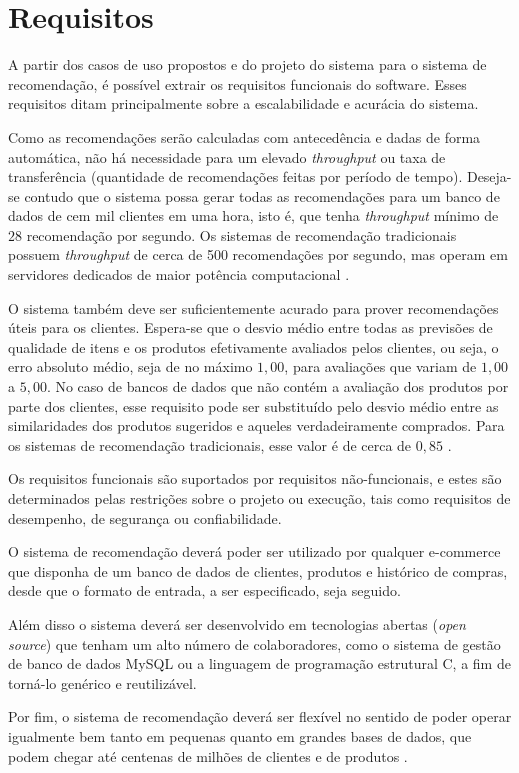 \chapter[Requisitos]{Requisitos}
\label{chap:requisitos}

A partir dos casos de uso propostos e do projeto do sistema para o sistema de recomendação, é possível extrair os requisitos funcionais do software. Esses requisitos ditam principalmente sobre a escalabilidade e acurácia do sistema.

Como as recomendações serão calculadas com antecedência e dadas de forma automática, não há necessidade para um elevado \textit{throughput} ou taxa de transferência (quantidade de recomendações feitas por período de tempo). Deseja-se contudo que o sistema possa gerar todas as recomendações para um banco de dados de cem mil clientes em uma hora, isto é, que tenha \textit{throughput} mínimo de $28$ recomendação por segundo. Os sistemas de recomendação tradicionais possuem \textit{throughput} de cerca de 500 recomendações por segundo, mas operam em servidores dedicados de maior potência computacional \cite{sarwar2001item}.  

O sistema também deve ser suficientemente acurado para prover recomendações úteis para os clientes. Espera-se que o desvio médio entre todas as previsões de qualidade de itens e os produtos efetivamente avaliados pelos clientes, ou seja, o erro absoluto médio, seja de no máximo $1,00$, para avaliações que variam de $1,00$ a $5,00$. No caso de bancos de dados que não contém a avaliação dos produtos por parte dos clientes, esse requisito pode ser substituído pelo desvio médio entre as similaridades dos produtos sugeridos e aqueles verdadeiramente comprados. Para os sistemas de recomendação tradicionais, esse valor é de cerca de $0,85$ \cite{sarwar2002recommender}.

Os requisitos funcionais são suportados por requisitos não-funcionais, e estes são determinados pelas restrições sobre o projeto ou execução, tais como requisitos de desempenho, de segurança ou confiabilidade. 

O sistema de recomendação deverá poder ser utilizado por qualquer e-commerce que disponha de um banco de dados de clientes, produtos e histórico de compras, desde que o formato de entrada, a ser especificado, seja seguido.

Além disso o sistema deverá ser desenvolvido em tecnologias abertas (\textit{open source}) que tenham um alto número de colaboradores, como o sistema de gestão de banco de dados MySQL ou a linguagem de programação estrutural C, a fim de torná-lo genérico e reutilizável.

Por fim, o sistema de recomendação deverá ser flexível no sentido de poder operar igualmente bem tanto em pequenas quanto em grandes bases de dados, que podem chegar até centenas de milhões de clientes \cite{amazoncustomers} e de produtos \cite{amazonproducts}.